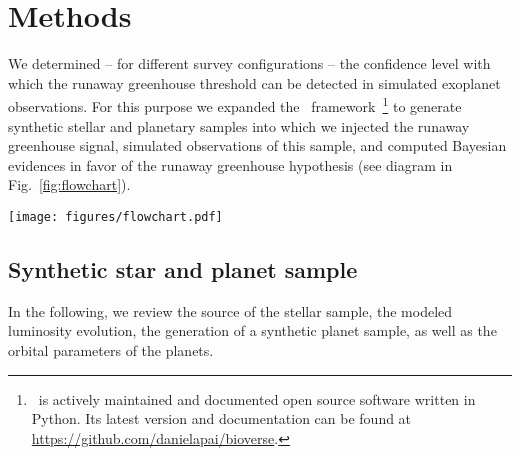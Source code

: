 \documentclass[modern]{aastex631}
\begin{document}
\section{Methods}\label{sec:methods}
We determined -- for different survey configurations -- the confidence level with which the runaway greenhouse threshold can be detected in simulated exoplanet observations.
For this purpose we expanded the \bioverse\ framework~\citep{Bixel2020,Bixel2021}\footnote{\bioverse\ is actively maintained and documented open source software written in Python. Its latest version and documentation can be found at \url{https://github.com/danielapai/bioverse}.} to generate synthetic stellar and planetary samples into which we injected the runaway greenhouse signal, simulated observations of this sample, and computed Bayesian evidences in favor of the runaway greenhouse hypothesis (see diagram in Fig.~\ref{fig:flowchart}).
\begin{figure*}
    \begin{centering}
        \texttt{[image: figures/flowchart.pdf]}
        \caption{Workflow of our hypothesis testing with \bioverse. In the first block, we generate a sample of stars and populate them with planets based on \kepler\ demographics.
            A fraction of them are then assigned a runaway greenhouse climate based on the model described in Sect.~\ref{sec:mo_model}.
        The second block simulates an exoplanet survey, whereby selection effects and detection biases are introduced. Finally, the third block deals with testing the runaway greenhouse hypothesis based on data from the survey simulation.
        By iterating through these steps, we compute the statistical power of testing the hypothesis given the assumed survey design.}
        \label{fig:flowchart}
    \end{centering}
\end{figure*}



\subsection{Synthetic star and planet sample}
In the following, we review the source of the stellar sample, the modeled luminosity evolution, the generation of a synthetic planet sample, as well as the orbital parameters of the planets.
\end{document}
